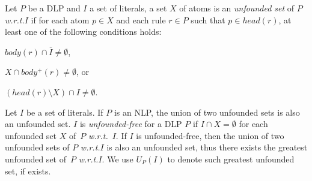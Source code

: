 \documentclass{article}
\makeatletter
\newenvironment{tight_itemize}{
\begin{itemize}
   \setlength{\itemsep}{0pt}%
  \setlength{\topsep}{0pt}%
  \setlength{\partopsep}{0pt}%
  \setlength{\parskip}{0pt}%
  \setlength{\parsep}{0pt}%
}{\end{itemize}}
\newtheorem{proposition}{Proposition}
\newenvironment{proof}{{\bf Proof:}}{\rule{2mm}{2mm}\\[-.5em] }
\newcommand\wrt{{\it w.r.t.\@ }}
\makeatother
\begin{document}

Let $P$ be a DLP and $I$ a set of literals, a set $X$ of atoms is an {\em unfounded set} of $P$ \wrt $I$ if for each atom $p\in X$ and each rule $r\in P$ such that $p\in head(r)$, at least one of the following conditions holds:
\begin{tight_itemize}
  \item $body(r) \cap \overline{I} \neq\emptyset$,
  \item $X\cap body^+(r)\neq\emptyset$, or
  \item $(head(r)\setminus X)\cap I\neq\emptyset$.
\end{tight_itemize}

\begin{comment}
\begin{proposition}
  Let $P$ be a logic program and $I$ a set of literals, a set $X$ of atoms is an unfounded set of $P$ w.r.t.\@ $I$ if and only if for every rule $r\in R^-(X, P)$, $I\models \neg body(r) \lor \bigvee_{q\in head(r)\setminus X} q$.
\end{proposition}
\begin{proof}
  $\Rightarrow$: $X$ is an unfounded set of $P$ w.r.t. $I$, then for every $r\in R^-(X, P)$, $I\models \neg body(r)$ or $(head(r)\setminus X)\cap I\neq\emptyset$. So $I\models \neg body(r)\lor \bigvee_{q\in head(r)\setminus X} q$.

  $\Leftarrow$: For every rule $r\in R^-(X, P)$, $I\models \neg body(r) \lor \bigvee_{q\in head(r)\setminus X} q$. For each rule $r'$ such that $head(r')\cap X\neq\emptyset$, $r'\notin R^-(X, P)$ or $r'\in R^-(X, P)$. If $r'\notin R^-(X, P)$, then $X\cap body^+(r')\neq\emptyset$. If $r'\in R^-(X, P)$, then $I\models \neg body(r)$ or $head(r)\setminus X)\cap I\neq\emptyset$. So $X$ is an unbounded set of $P$ w.r.t. $I$.
\end{proof}
\end{comment}

Let $I$ be a set of literals.
If $P$ is an NLP, the union of two unfounded sets is also an unfounded set.
$I$ is {\em unfounded-free} for a DLP $P$ if $I\cap X=\emptyset$ for each unfounded set $X$ of~$P$ \wrt~$I$.
If $I$ is unfounded-free, then the union of two unfounded sets of $P$ \wrt $I$ is also an unfounded set, thus there exists the greatest unfounded set of~$P$ \wrt $I$.
We use $U_P(I)$ to denote such greatest unfounded set, if exists.
\end{document}
